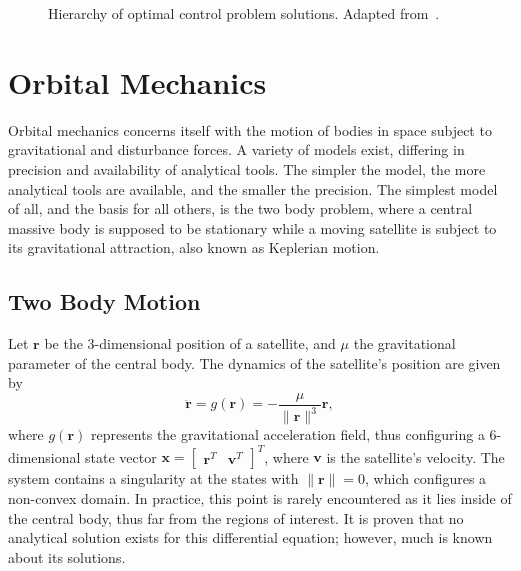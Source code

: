 \begin{figure}[htbp]
    \centering
    \caption{Hierarchy of optimal control problem solutions. Adapted from~.}
    \label{fig:opt_sol_hierarchy}
\end{figure}

\section{Orbital Mechanics}

Orbital mechanics concerns itself with the motion of bodies in space subject to gravitational and disturbance forces. A variety of models exist, differing in precision and availability of analytical tools. The simpler the model, the more analytical tools are available, and the smaller the precision. The simplest model of all, and the basis for all others, is the two body problem, where a central massive body is supposed to be stationary while a moving satellite is subject to its gravitational attraction, also known as Keplerian motion. 

\subsection{Two Body Motion}

Let \(\mathbf{r}\) be the 3-dimensional position of a satellite, and \(\mu \) the gravitational parameter of the central body. The dynamics of the satellite's position are given by~\cite{curtis2015orbital}
\begin{equation} \label{eq:kepler_dyn}
    \ddot{\mathbf{r}} = g(\mathbf{r}) = -\frac{\mu}{\lVert \mathbf{r} \rVert^3} \mathbf{r},
\end{equation}
where \(g(\mathbf{r})\) represents the gravitational acceleration field, thus configuring a 6-dimensional state vector \(\mathbf{x} = \begin{bmatrix}
    \mathbf{r}^T & \mathbf{v}^T
\end{bmatrix}^T\), where \(\mathbf{v}\) is the satellite's velocity. The system contains a singularity at the states with \(\lVert \mathbf{r} \rVert = 0\), which configures a non-convex domain. In practice, this point is rarely encountered as it lies inside of the central body, thus far from the regions of interest. It is proven that no analytical solution exists for this differential equation; however, much is known about its solutions.

